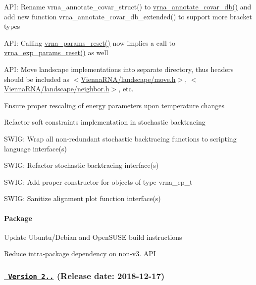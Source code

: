 \begin{DoxyItemize}
\item A\+PI\+: Rename {\ttfamily vrna\+\_\+annotate\+\_\+covar\+\_\+struct()} to {\ttfamily \mbox{\hyperlink{group__annotation__utils_ga01fad860df6c799264d1186c343b1d29}{vrna\+\_\+annotate\+\_\+covar\+\_\+db()}}} and add new function {\ttfamily vrna\+\_\+annotate\+\_\+covar\+\_\+db\+\_\+extended()} to support more bracket types
\item A\+PI\+: Calling {\ttfamily \mbox{\hyperlink{group__energy__parameters_gac40dc82e48a72a97cfc58b9da08a7792}{vrna\+\_\+params\+\_\+reset()}}} now implies a call to {\ttfamily \mbox{\hyperlink{group__energy__parameters_gaa5409218068be84d7b50c78fbdaa85a9}{vrna\+\_\+exp\+\_\+params\+\_\+reset()}}} as well
\item A\+PI\+: Move landscape implementations into separate directory, thus headers should be included as {\ttfamily $<$\mbox{\hyperlink{move_8h}{Vienna\+R\+N\+A/landscape/move.\+h}}$>$}, {\ttfamily $<$\mbox{\hyperlink{landscape_2neighbor_8h}{Vienna\+R\+N\+A/landscape/neighbor.\+h}}$>$}, etc.
\item Ensure proper rescaling of energy parameters upon temperature changes
\item Refactor soft constraints implementation in stochastic backtracing
\item S\+W\+IG\+: Wrap all non-\/redundant stochastic backtracing functions to scripting language interface(s)
\item S\+W\+IG\+: Refactor stochastic backtracing interface(s)
\item S\+W\+IG\+: Add proper constructor for objects of type {\ttfamily vrna\+\_\+ep\+\_\+t}
\item S\+W\+IG\+: Sanitize alignment plot function interface(s)
\end{DoxyItemize}

\paragraph*{Package}


\begin{DoxyItemize}
\item Update Ubuntu/\+Debian and Open\+S\+U\+SE build instructions
\item Reduce intra-\/package dependency on non-\/v3. A\+PI
\end{DoxyItemize}

\subsubsection*{\href{https://github.com/ViennaRNA/ViennaRNA/compare/v2.4.10...v2.4.11}{\texttt{ Version 2..}} (Release date\+: 2018-\/12-\/17)}

